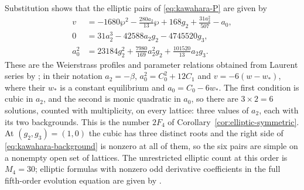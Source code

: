 Substitution shows that the elliptic pairs of \eqref{eq:kawahara-P} are
given by
\begin{align}
 v&=-1680\wp^2-\frac{280a_2}{13}\wp
       +168g_2+\frac{31a_2^2}{507}-a_0,
       \label{eq:kawahara-elliptic}\\
 0&=31a_2^3-42588a_2g_2-4745520g_3,
       \label{eq:kawahara-cubic}\\
 a_0^2&=23184g_2^2+\frac{7980}{169}a_2^2g_2
                       +\frac{101520}{13}a_2g_3.
       \label{eq:kawahara-background}
\end{align}
These are the Weierstrass profiles and parameter relations obtained
from Laurent series by
\citet[Section~3]{DeminaKudryashovKawahara2010}; in their notation
\(a_2=-\beta\), \(a_0^2=C_0^2+12C_1\) and \(v=-6(w-w_\ast)\), where
their \(w_\ast\) is a constant equilibrium and \(a_0=C_0-6w_\ast\).
The first condition is cubic in \(a_2\), and the second is monic
quadratic in \(a_0\), so there are \(3\times2=6\) solutions, counted
with multiplicity, on every lattice: three values of \(a_2\), each with
its two backgrounds. This is the number \(2F_4\) of
Corollary~\ref{cor:elliptic-symmetric}. At \((g_2,g_3)=(1,0)\) the
cubic has three distinct roots and the right side of
\eqref{eq:kawahara-background} is nonzero at all of them, so the six
pairs are simple on a nonempty open set of lattices.
The unrestricted elliptic count at this order is \(M_4=30\); elliptic
formulas with nonzero odd derivative coefficients in the full
fifth-order evolution equation are given by
\citet{KudryashovSinelshchikov2012}.

